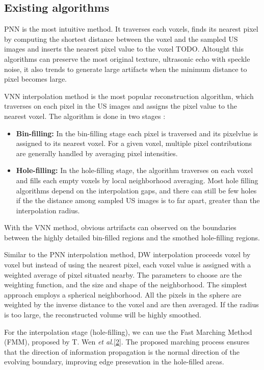 \documentclass[12pt,journal,compsoc]{IEEEtran}
\begin{document}
\subsection{Existing algorithms}

PNN is the most intuitive method. It traverses each voxels, finds its nearest pixel by computing the shortest distance between the voxel and the sampled US images and inserts the nearest pixel value to the voxel TODO.
Altought this algorithms can preserve the most original texture, ultrasonic echo with speckle noise, it also trends to generate large artifacts when the minimum distance to pixel becomes large.\par

VNN interpolation method is the most popular reconstruction algorithm, which traverses on each pixel in the US images and assigns the pixel value to the nearest voxel.
The algorithm is done in two stages :
\begin{itemize}
	\item \textbf{Bin-filling:} In the bin-filling stage each pixel is traversed and its pixelvlue is assigned to its nearest voxel. For a given voxel, multiple pixel contributions are generally handled by averaging pixel intensities.  
	\item \textbf{Hole-filling:} In the hole-filling stage, the algorithm traverses on each voxel and fills each empty voxels by local neighborhood averaging. Most hole filling algorithms depend on the interpolation gaps, and there can still be few holes if the the distance among sampled US images is to far apart, greater than the interpolation radius. 
\end{itemize}
With the VNN method, obvious artrifacts can observed on the boundaries between the highly detailed bin-filled regions and the smothed hole-filling regions.\par

Similar to the PNN interpolation method, DW interpolation proceeds voxel by voxel but instead of using the nearest pixel, each voxel value is assigned with a weighted average of pixel situated nearby. The parameters to choose are the weighting function, and the size and shape of the neighborhood. The simplest approach employs a spherical neighborhood. All the pixels in the sphere are weighted by the inverse distance to the voxel and are then averaged. If the radius is too large, the reconstructed volume will be highly smoothed.

For the interpolation stage (hole-filling), we can use the Fast Marching Method (FMM), proposed by T. Wen \textit{et al.}\ref{2}. The proposed marching process ensures that the direction of information propagation is the normal direction of the evolving boundary, improving edge presevation in the hole-filled areas.
\end{document}
